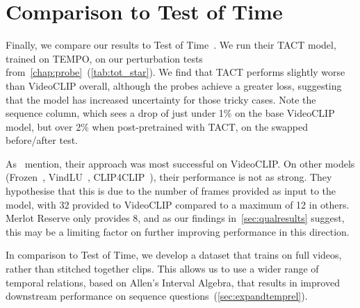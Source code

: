 \section{Comparison to Test of Time}
\label{sec:tactcompare}

Finally, we compare our results to Test of Time~\citep{bagad2023testoftime}. We
run their TACT model, trained on TEMPO, on our perturbation tests
from~\cref{chap:probe}~(\cref{tab:tot_star}). We find that TACT performs
slightly worse than VideoCLIP  overall, although the probes achieve a
greater loss, suggesting that the model has increased uncertainty for those
tricky cases. Note the sequence column, which sees a drop of just under 1\%
on the base VideoCLIP model, but over 2\% when post-pretrained with TACT, on
the swapped before/after test.


As~\citet{bagad2023testoftime} mention, their approach was most successful on
VideoCLIP. On other models (Frozen~\citep{bain2021frozen},
VindLU~\citep{cheng2023vindlu}, CLIP4CLIP~\citep{luo2022clip4clip}), their
performance is not as strong. They hypothesise that this is due to the number
of frames provided as input to the model, with 32 provided to VideoCLIP
compared to a maximum of 12 in others. Merlot Reserve only provides 8, and as
our findings in~\cref{sec:qualresults} suggest, this may be a limiting factor
on further improving performance in this direction.

In comparison to Test of Time, we develop a dataset that trains on full videos,
rather than stitched together clips. This allows us to use a wider range of
temporal relations, based on Allen's Interval Algebra, that results in improved
downstream performance on sequence questions~(\cref{sec:expandtemprel}).


